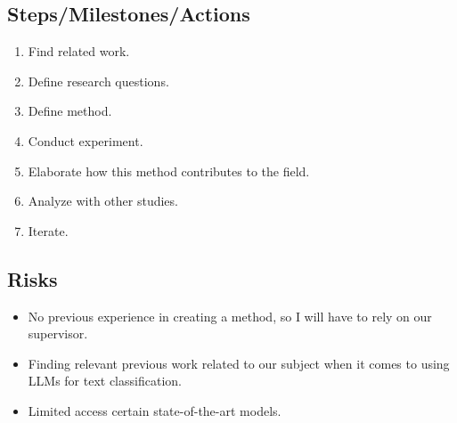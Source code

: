 \subsection{Steps/Milestones/Actions}

\begin{enumerate}
    \item Find related work.
    \item Define research questions.
    \item Define method.
    \item Conduct experiment.
    \item Elaborate how this method contributes to the field.
    \item Analyze with other studies.
    \item Iterate.
\end{enumerate}

\subsection{Risks}

\begin{itemize}
    \item No previous experience in creating a method, so I will have to rely
          on our supervisor.
    \item Finding relevant previous work related to our subject when it comes
          to using LLMs for text classification.
    \item Limited access certain state-of-the-art models.
\end{itemize}
